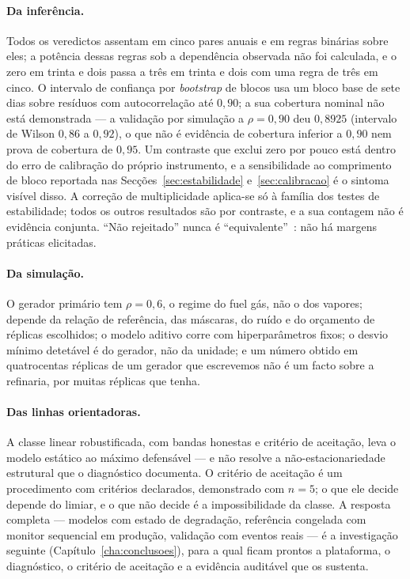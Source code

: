 \paragraph{Da inferência.} Todos os veredictos assentam em cinco pares
anuais e em regras binárias sobre eles; a potência dessas regras sob a
dependência observada não foi calculada, e o zero em trinta e dois passa a
três em trinta e dois com uma regra de três em cinco. O intervalo de
confiança por \emph{bootstrap} de blocos usa um bloco base de sete dias
sobre resíduos com autocorrelação até $0{,}90$; a sua cobertura nominal não
está demonstrada --- a validação por simulação a $\rho = 0{,}90$ deu
$0{,}8925$ (intervalo de Wilson $0{,}86$ a $0{,}92$), o que não é evidência
de cobertura inferior a $0{,}90$ nem prova de cobertura de $0{,}95$. Um
contraste que exclui zero por pouco está dentro do erro de calibração do
próprio instrumento, e a sensibilidade ao comprimento de bloco reportada
nas Secções~\ref{sec:estabilidade} e~\ref{sec:calibracao} é o sintoma
visível disso. A correção de multiplicidade aplica-se só à família dos
testes de estabilidade; todos os outros resultados são por contraste, e a
sua contagem não é evidência conjunta. ``Não rejeitado'' nunca é
``equivalente''~\cite{Lakens2017}: não há margens práticas elicitadas.

\paragraph{Da simulação.} O gerador primário tem $\rho = 0{,}6$, o regime do
fuel gás, não o dos vapores; depende da relação de referência, das
máscaras, do ruído e do orçamento de réplicas escolhidos; o modelo aditivo
corre com hiperparâmetros fixos; o desvio mínimo detetável é do gerador, não
da unidade; e um número obtido em quatrocentas réplicas de um gerador que
escrevemos não é um facto sobre a refinaria, por muitas réplicas que tenha.

\paragraph{Das linhas orientadoras.} A classe linear robustificada, com
bandas honestas e critério de aceitação, leva o modelo estático ao máximo
defensável --- e não resolve a não-estacionariedade estrutural que o
diagnóstico documenta. O critério de aceitação é um procedimento com
critérios declarados, demonstrado com $n = 5$; o que ele decide depende do
limiar, e o que não decide é a impossibilidade da classe. A resposta
completa --- modelos com estado de degradação, referência congelada com
monitor sequencial em produção, validação com eventos reais --- é a
investigação seguinte (Capítulo~\ref{cha:conclusoes}), para a qual ficam
prontos a plataforma, o diagnóstico, o critério de aceitação e a evidência
auditável que os sustenta.
